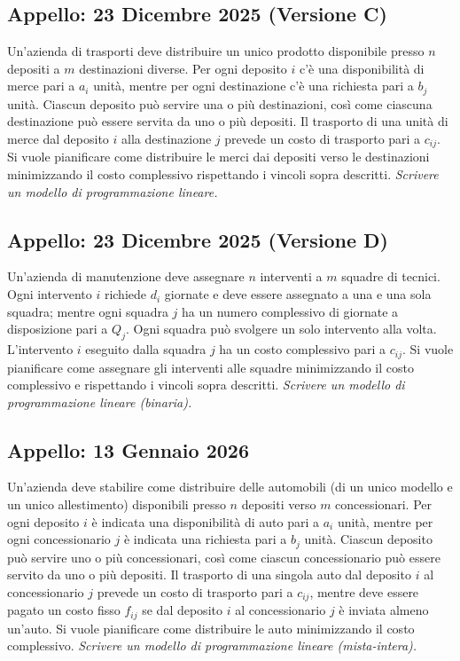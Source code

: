 \documentclass[11pt, a4paper]{article}
\begin{document}
\subsection{Appello: 23 Dicembre 2025 (Versione C)}
Un’azienda di trasporti deve distribuire un unico prodotto disponibile presso $n$ depositi a $m$ destinazioni diverse. Per ogni deposito $i$ c’è una disponibilità di merce pari a $a_i$ unità, mentre per ogni destinazione c’è una richiesta pari a $b_j$ unità. Ciascun deposito può servire una o più destinazioni, così come ciascuna destinazione può essere servita da uno o più depositi. Il trasporto di una unità di merce dal deposito $i$ alla destinazione $j$ prevede un costo di trasporto pari a $c_{ij}$. Si vuole pianificare come distribuire le merci dai depositi verso le destinazioni minimizzando il costo complessivo rispettando i vincoli sopra descritti.
\textit{Scrivere un modello di programmazione lineare.}

\subsection{Appello: 23 Dicembre 2025 (Versione D)}
Un’azienda di manutenzione deve assegnare $n$ interventi a $m$ squadre di tecnici. Ogni intervento $i$ richiede $d_i$ giornate e deve essere assegnato a una e una sola squadra; mentre ogni squadra $j$ ha un numero complessivo di giornate a disposizione pari a $Q_j$. Ogni squadra può svolgere un solo intervento alla volta. L’intervento $i$ eseguito dalla squadra $j$ ha un costo complessivo pari a $c_{ij}$. Si vuole pianificare come assegnare gli interventi alle squadre minimizzando il costo complessivo e rispettando i vincoli sopra descritti.
\textit{Scrivere un modello di programmazione lineare (binaria).}

\subsection{Appello: 13 Gennaio 2026}
Un’azienda deve stabilire come distribuire delle automobili (di un unico modello e un unico allestimento) disponibili presso $n$ depositi verso $m$ concessionari. Per ogni deposito $i$ è indicata una disponibilità di auto pari a $a_i$ unità, mentre per ogni concessionario $j$ è indicata una richiesta pari a $b_j$ unità. Ciascun deposito può servire uno o più concessionari, così come ciascun concessionario può essere servito da uno o più depositi. Il trasporto di una singola auto dal deposito $i$ al concessionario $j$ prevede un costo di trasporto pari a $c_{ij}$, mentre deve essere pagato un costo fisso $f_{ij}$ se dal deposito $i$ al concessionario $j$ è inviata almeno un’auto. Si vuole pianificare come distribuire le auto minimizzando il costo complessivo.
\textit{Scrivere un modello di programmazione lineare (mista-intera).}
\end{document}
